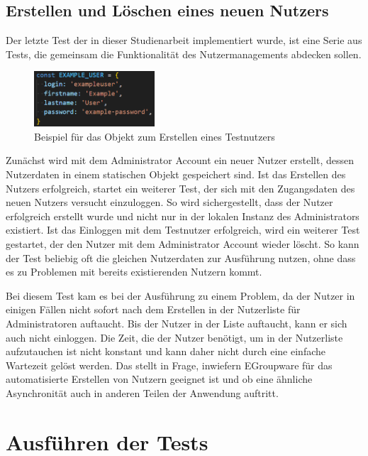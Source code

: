 \newpage
\subsection*{Erstellen und Löschen eines neuen Nutzers}

Der letzte Test der in dieser Studienarbeit implementiert wurde, ist eine Serie aus Tests, die gemeinsam die Funktionalität des Nutzermanagements abdecken sollen.
\begin{figure}[H]
    \centering
    \includegraphics[width=0.4\textwidth]{images/Exampleuser.png}
    \caption{Beispiel für das Objekt zum Erstellen eines Testnutzers}
    \label{fig:example-user}
\end{figure}
Zunächst wird mit dem Administrator Account ein neuer Nutzer erstellt, dessen Nutzerdaten in einem statischen Objekt gespeichert sind.
Ist das Erstellen des Nutzers erfolgreich, startet ein weiterer Test, der sich mit den Zugangsdaten des neuen Nutzers versucht einzuloggen.
So wird sichergestellt, dass der Nutzer erfolgreich erstellt wurde und nicht nur in der lokalen Instanz des Administrators existiert.
Ist das Einloggen mit dem Testnutzer erfolgreich, wird ein weiterer Test gestartet, der den Nutzer mit dem Administrator Account wieder löscht.
So kann der Test beliebig oft die gleichen Nutzerdaten zur Ausführung nutzen, ohne dass es zu Problemen mit bereits existierenden Nutzern kommt.

Bei diesem Test kam es bei der Ausführung zu einem Problem, da der Nutzer in einigen Fällen nicht sofort nach dem Erstellen in der Nutzerliste für Administratoren auftaucht.
Bis der Nutzer in der Liste auftaucht, kann er sich auch nicht einloggen.
Die Zeit, die der Nutzer benötigt, um in der Nutzerliste aufzutauchen ist nicht konstant und kann daher nicht durch eine einfache Wartezeit gelöst werden.
Das stellt in Frage, inwiefern EGroupware für das automatisierte Erstellen von Nutzern geeignet ist und ob eine ähnliche Asynchronität auch in anderen Teilen der Anwendung auftritt.

\section{Ausführen der Tests}

